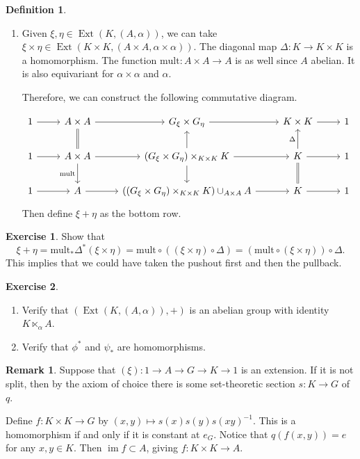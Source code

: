 \documentclass[10pt,letterpaper,cm]{nupset}
\theoremstyle{definition}
\newtheorem*{definition}{Definition}
\newtheorem{remark}{Remark}
\newtheorem{exercise}{Exercise}
\newcommand{\1}{\mathbf{1}}
\newcommand{\0}{\vec 0}
\DeclareMathOperator{\ext}{Ext}
\DeclareMathOperator{\im}{im}
\begin{document}
\begin{definition}
\begin{enumerate}
\item Given $\xi, \eta \in \ext(K, (A, \alpha))$, we can take $\xi \times \eta \in \ext(K \times K, (A\times A, \alpha \times \alpha))$. The diagonal map $\Delta : K \to K \times K$ is a homomorphism. The function $\text{mult}: A \times A \to A$ is as well since $A$ abelian. It is also equivariant for $\alpha \times \alpha$ and $\alpha$.

Therefore, we can construct the following commutative diagram.

\[
\begin{tikzcd}
1 \arrow[r] & A\times A \arrow[r] & G_{\xi}\times G_{\eta} \arrow[r] & K\times K \arrow[r] & 1 \\
1 \arrow[r] & A\times A \arrow[r] \arrow[d, "\text{mult}"'] \arrow[u, equal] & (G_{\xi} \times G_{\eta}) \times_{K\times K} K \arrow[r] \arrow[u] \arrow[d] & K \arrow[r] \arrow[u, "\Delta"] \arrow[d, equal] & 1 \\
1 \arrow[r] & A \arrow[r] & ((G_{\xi} \times G_{\eta}) \times_{K\times K} K) \cup_{A\times A} A \arrow[r] & K \arrow[r] & 1
\end{tikzcd}
\]
Then define $\xi + \eta$ as the bottom row.
\end{enumerate}
\end{definition}

\begin{exercise}
Show that $$\xi + \eta = \text{mult}_{\ast} \Delta^{\ast}(\xi \times \eta) = \text{mult} \circ ((\xi \times \eta)\circ \Delta) = (\text{mult} \circ (\xi \times \eta))\circ \Delta.$$ This implies that we could have taken the pushout first and then the pullback.
\end{exercise}

\begin{exercise} $ $
\begin{enumerate}
\item Verify that $(\ext(K, (A, \alpha)), +)$ is an abelian group with identity $K \ltimes_{\alpha} A$. 
\item Verify that $\phi^{\ast}$ and $\psi_{\ast}$ are homomorphisms.  
\end{enumerate}
\end{exercise}

\begin{remark}
Suppose that $(\xi) : 1\to A \to G \to K \to 1$ is an extension. If it is not split, then by the axiom of choice there is some set-theoretic section $s: K \to G$ of $q$.

Define $f : K \times K\to G$ by $(x, y) \mapsto s(x)s(y)s(xy)^{-1}$. This is a homomorphism if and only if it is constant at $e_G$. Notice that $q(f(x,y)) = e$ for any $x,y\in K$. Then $\im f \subset A$, giving $f: K\times K \to A$.
\end{remark}
\end{document}
